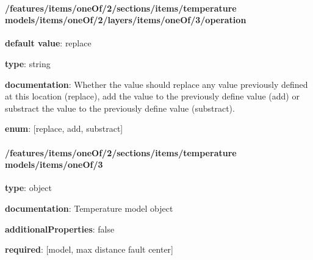 \begin{itemized}
\end{itemized}\paragraph{/features/items/oneOf/2/sections/items/temperature models/items/oneOf/2/layers/items/oneOf/3/operation} \begin{itemized}
\item {\bf default value}: replace
\item {\bf type}: string
\item {\bf documentation}: Whether the value should replace any value previously defined at this location (replace), add the value to the previously define value (add) or substract the value to the previously define value (substract).
\item {\bf enum}: [replace, add, substract]\end{itemized}\paragraph{/features/items/oneOf/2/sections/items/temperature models/items/oneOf/3} \begin{itemized}
\item {\bf type}: object
\item {\bf documentation}: Temperature model object
\item {\bf additionalProperties}: false
\item {\bf required}: [model, max distance fault center]\end{itemized}
